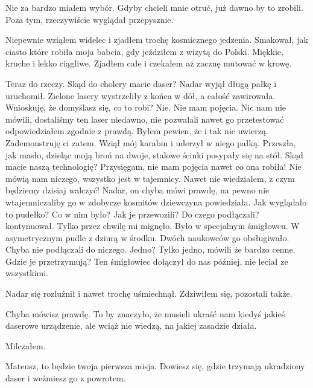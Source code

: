 Nie za bardzo miałem wybór. 
Gdyby chcieli mnie otruć, już dawno by to zrobili.
Poza tym, rzeczywiście wyglądał przepysznie.

Niepewnie wziąłem widelec i zjadłem trochę kosmicznego jedzenia.
Smakował, jak ciasto które robiła moja babcia, gdy jeździłem z wizytą do Polski.
Miękkie, kruche i lekko ciągliwe.
Zjadłem całe i czekałem aż zacznę mutować w krowę.

\begin{dialogue}
\ds{} Teraz do rzeczy. Skąd do cholery macie daser? \dm{} Nadar wyjął długą pałkę i uruchomił. Zielone lasery wystrzeliły z końca w dół, a całość zawirowała.
\dm{} Wnioskuję, że domyślasz się, co to robi?
\ds{} Nie. Nie mam pojęcia. Nic nam nie mówili, dostaliśmy ten laser niedawno, nie pozwalali nawet go przetestować \dm{} odpowiedziałem zgodnie z prawdą. Byłem pewien, że i tak nie uwierzą.
\ds{} Zademonstruję ci zatem. \dm{} Wziął mój karabin i uderzył w niego pałką. Przeszła, jak masło, dzieląc moją broń na dwoje, stalowe ścinki posypały się na stół. \dm{} Skąd macie naszą technologię?
\ds{} Przysięgam, nie mam pojęcia nawet co ona robiła! Nie mówią nam niczego, wszystko jest w tajemnicy. Nawet nie wiedziałem, z czym będziemy dzisiaj walczyć!
\ds{} Nadar, on chyba mówi prawdę, na pewno nie wtajemniczaliby go w zdobycze kosmitów \dm{} dziewczyna powiedziała.
\ds{} Jak wyglądało to pudełko? Co w nim było? Jak je przewozili? Do czego podłączali? \dm{} kontynuował.
\ds{} Tylko przez chwilę mi mignęło. Było w specjalnym śmigłowcu. W asymetrycznym pudle z dziurą w środku. Dwóch naukowców go obsługiwało. Chyba nie podłączali do niczego.
\ds{} Jedno?
\ds{} Tylko jedno, mówili że bardzo cenne.
\ds{} Gdzie je przetrzymują?
\ds{} Ten śmigłowiec dołączył do nas później, nie leciał ze wszystkimi.
\end{dialogue}

Nadar się rozluźnił i nawet trochę uśmiechnął.
Zdziwiłem się, pozostali także.

\begin{dialogue}
\ds{} Chyba mówisz prawdę. To by znaczyło, że musieli ukraść nam kiedyś jakieś daserowe urządzenie, ale wciąż nie wiedzą, na jakiej zasadzie działa.
\end{dialogue}

Milczałem.

\begin{dialogue}
\ds{} Mateusz, to będzie twoja pierwsza misja. Dowiesz się, gdzie trzymają ukradziony daser i weźmiesz go z powrotem. 
\end{dialogue}

